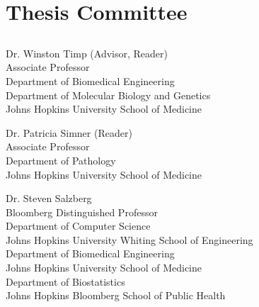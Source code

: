\chapter*{Thesis Committee}

\section*{}

\begin{singlespace}


\indent Dr. Winston Timp (Advisor, Reader)\\
\indent \indent Associate Professor \\
\indent \indent Department of Biomedical Engineering \\
\indent \indent Department of Molecular Biology and Genetics \\
\indent \indent Johns Hopkins University School of Medicine \\



\smallskip

\noindent Dr. Patricia Simner (Reader) \\
\indent \indent Associate Professor \\
\indent \indent Department of Pathology \\
\indent \indent Johns Hopkins University School of Medicine \\


\smallskip

\noindent Dr. Steven Salzberg \\
\indent \indent Bloomberg Distinguished Professor \\
\indent \indent Department of Computer Science \\
\indent \indent Johns Hopkins University Whiting School of Engineering \\
\indent \indent Department of Biomedical Engineering \\
\indent \indent Johns Hopkins University School of Medicine \\
\indent \indent Department of Biostatistics \\
\indent \indent Johns Hopkins Bloomberg School of Public Health \\



\end{singlespace}
